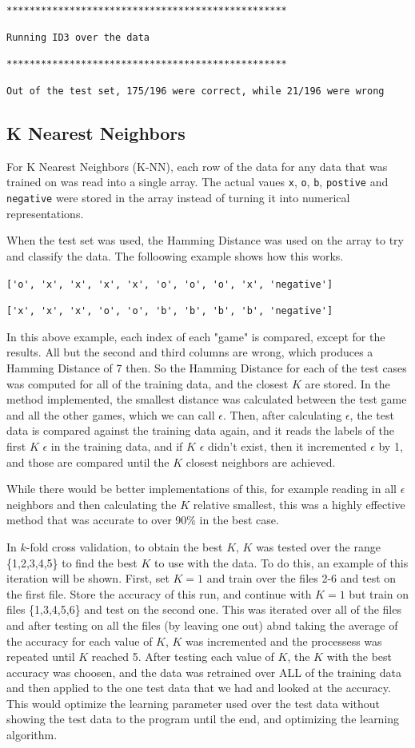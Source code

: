 \documentclass[listings, listings-bw, listings-color, listings-sv]{article}
\begin{document}
\verb~*************************************************~

\verb~Running ID3 over the data~

\verb~*************************************************~

\verb~Out of the test set, 175/196 were correct, while 21/196 were wrong~
\subsection{K Nearest Neighbors}
\label{sec-3-5}
For K Nearest Neighbors (K-NN), each row of the data for any data that was trained on was read into a single array. The actual vaues \verb~x~, \verb~o~, \verb~b~, \verb~postive~ and \verb~negative~ were stored in the array instead of turning it into numerical representations.

When the test set was used, the Hamming Distance was used on the array to try and classify the data. The folloowing example shows how this works.

\verb~['o', 'x', 'x', 'x', 'x', 'o', 'o', 'o', 'x', 'negative']~

\verb~['x', 'x', 'x', 'o', 'o', 'b', 'b', 'b', 'b', 'negative']~

In this above example, each index of each "game" is compared, except for the results. All but the second and third columns are wrong, which produces a Hamming Distance of 7 then. So the Hamming Distance for each of the test cases was computed for all of the training data, and the closest $K$ are stored. In the method implemented, the smallest distance was calculated between the test game and all the other games, which we can call $\epsilon$. Then, after calculating $\epsilon$, the test data is compared against the training data again, and it reads the labels of the first $K$ $\epsilon$ in the training data, and if $K$ $\epsilon$ didn't exist, then it incremented $\epsilon$ by 1, and those are compared until the $K$ closest neighbors are achieved.

While there would be better implementations of this, for example reading in all $\epsilon$ neighbors and then calculating the $K$ relative smallest, this was a highly effective method that was accurate to over 90\% in the best case.

In $k$-fold cross validation, to obtain the best $K$, $K$ was tested over the range \{1,2,3,4,5\} to find the best $K$ to use with the data. To do this, an example of this iteration will be shown. First, set $K=1$ and train over the files 2-6 and test on the first file. Store the accuracy of this run, and continue with $K=1$ but train on files \{1,3,4,5,6\} and test on the second one. This was iterated over all of the files and after testing on all the files (by leaving one out) abnd taking the average of the accuracy for each value of $K$, $K$ was incremented and the processess was repeated until $K$ reached 5. After testing each value of $K$, the $K$ with the best accuracy was choosen, and the data was retrained over ALL of the training data and then applied to the one test data that we had and looked at the accuracy. This would optimize the learning parameter used over the test data without showing the test data to the program until the end, and optimizing the learning algorithm.
\end{document}
